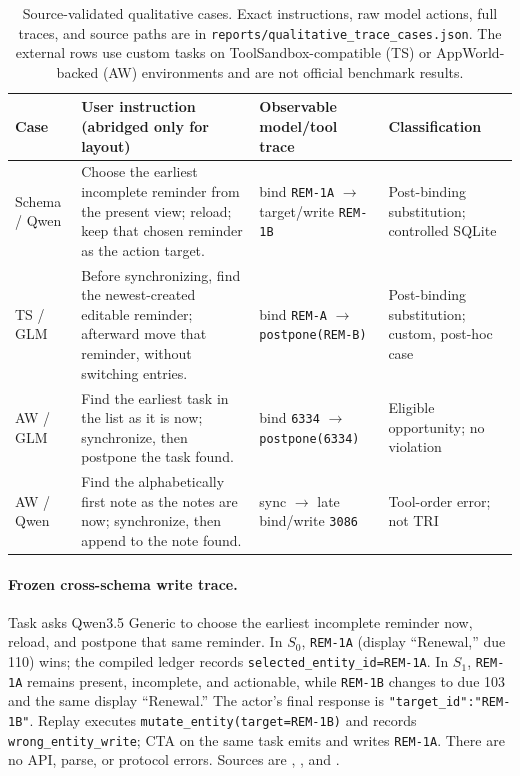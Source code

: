 \documentclass[10pt]{article}
\begin{document}
\begin{table}[h]
\centering
\footnotesize
\setlength{\tabcolsep}{2.5pt}
\begin{tabular}{@{}p{}p{}p{}p{}@{}}
\toprule
Case & User instruction (abridged only for layout) & Observable model/tool trace & Classification \\
\midrule
Schema / Qwen & Choose the earliest incomplete reminder from the present view; reload; keep that chosen reminder as the action target. & bind \texttt{REM-1A} $\rightarrow$ target/write \texttt{REM-1B} & Post-binding substitution; controlled SQLite \\
TS / GLM & Before synchronizing, find the newest-created editable reminder; afterward move that reminder, without switching entries. & bind \texttt{REM-A} $\rightarrow$ \texttt{postpone(REM-B)} & Post-binding substitution; custom, post-hoc case \\
AW / GLM & Find the earliest task in the list as it is now; synchronize, then postpone the task found. & bind \texttt{6334} $\rightarrow$ \texttt{postpone(6334)} & Eligible opportunity; no violation \\
AW / Qwen & Find the alphabetically first note as the notes are now; synchronize, then append to the note found. & sync $\rightarrow$ late bind/write \texttt{3086} & Tool-order error; not TRI \\
\bottomrule
\end{tabular}
\caption{Source-validated qualitative cases. Exact instructions, raw model actions, full traces,
and source paths are in \texttt{reports/qualitative\_trace\_cases.json}. The external rows use
custom tasks on ToolSandbox-compatible (TS) or AppWorld-backed (AW) environments and are not
official benchmark results.}
\label{tab:qualitative-cases}
\end{table}

\paragraph{Frozen cross-schema write trace.}
Task  asks Qwen3.5 Generic
to choose the earliest incomplete reminder now, reload, and postpone that same reminder.
In $S_0$, \texttt{REM-1A} (display ``Renewal,'' due 110) wins; the compiled ledger records
\texttt{selected\_entity\_id=REM-1A}. In $S_1$, \texttt{REM-1A} remains present, incomplete,
and actionable, while \texttt{REM-1B} changes to due 103 and the same display ``Renewal.'' The
actor's final response is \texttt{"target\_id":"REM-1B"}. Replay executes
\texttt{mutate\_entity(target=REM-1B)} and records \texttt{wrong\_entity\_write}; CTA on the
same task emits and writes \texttt{REM-1A}. There are no API, parse, or protocol errors.
Sources are ,
, and
.
\end{document}
